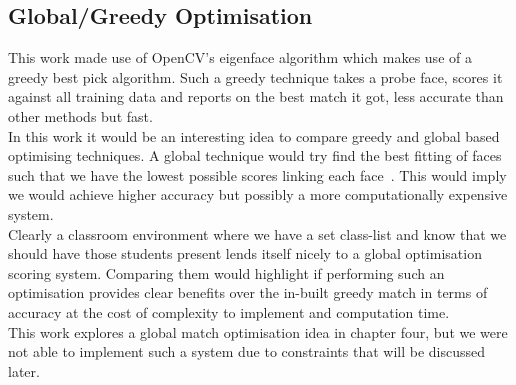 	\subsection{Global/Greedy Optimisation}
		This work made use of OpenCV's eigenface algorithm which makes use of a greedy best pick algorithm.  Such a greedy 
		technique takes a probe face, scores it against all training data and reports on the best match it got, less accurate 
		than other methods but fast. \\
		
		In this work it would be an interesting idea to compare greedy and global based optimising techniques.  A global technique 
		would try find the best fitting of faces such that we have the lowest possible scores linking each face~\cite{GlOP1989}.  
		This would imply we would achieve higher accuracy but possibly a more computationally expensive system.  \\
		
		Clearly a classroom environment where we have a set class-list and know that we should have those students present lends 
		itself nicely to a global optimisation scoring system.  Comparing them would highlight if performing such an optimisation
		provides clear benefits over the in-built greedy match in terms of accuracy at the cost of complexity to implement and 
		computation time. \\
		
		This work explores a global match optimisation idea in chapter four,  but we were not able to implement such a system due to constraints 
		that will be discussed later.